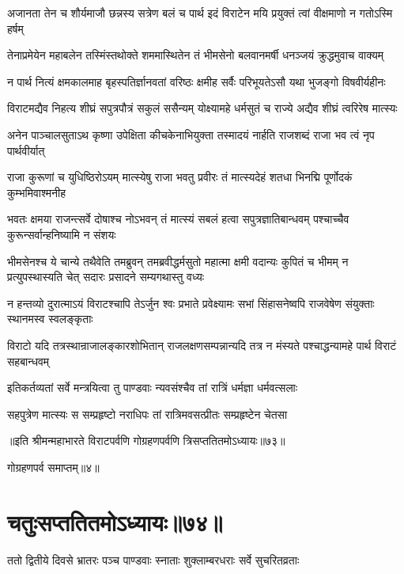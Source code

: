 \fourlineindentedshloka
{अजानता तेन च शौर्यमाजौ}
{छन्नस्य सत्रेण बलं च पार्थ}
{इदं विराटेन मयि प्रयुक्तं}
{त्वां वीक्षमाणो न गतोऽस्मि हर्षम्}


\fourlineindentedshloka
{तेनाप्रमेयेन महाबलेन}
{तस्मिंस्तथोक्ते शममास्थितेन}
{तं भीमसेनो बलवानमर्षी}
{धनञ्जयं क्रुद्धमुवाच वाक्यम्}


\fourlineindentedshloka
{न पार्थ नित्यं क्षमकालमाह}
{बृहस्पतिर्ज्ञानवतां वरिष्ठः}
{क्षमीह सर्वैः परिभूयतेऽसौ}
{यथा भुजङ्गो विषवीर्यहीनः}


\fourlineindentedshloka
{विराटमद्यैव निहत्य शीघ्रं}
{सपुत्रपौत्रं सकुलं ससैन्यम्}
{योक्ष्यामहे धर्मसुतं च राज्ये}
{अद्यैव शीघ्रं त्वरिरेष मात्स्यः}


\fourlineindentedshloka
{अनेन पाञ्चालसुताऽथ कृष्णा}
{उपेक्षिता कीचकेनाभियुक्ता}
{तस्मादयं नार्हति राजशब्दं}
{राजा भव त्वं नृप पार्थवीर्यात्}


\fourlineindentedshloka
{राजा कुरूणां च युधिष्ठिरोऽयम्}
{मात्स्येषु राजा भवतु प्रवीरः}
{तं मात्स्यदेहं शतधा भिनद्मि}
{पूर्णोदकं कुम्भमिवाश्मनीह}




\threelineshloka
{भवतः क्षमया राजन्त्सर्वे दोषाश्च नोऽभवन्}
{तं मात्स्यं सबलं हत्वा सपुत्रज्ञातिबान्धवम्}
{पश्चाच्चैव कुरून्सर्वान्हनिष्यामि न संशयः}


\onelineshloka
{भीमसेनश्च ये चान्ये तथैवेति तमब्रुवन्}
\fourlineindentedshloka
{तमब्रवीद्धर्मसुतो महात्मा}
{क्षमी वदान्यः कुपितं च भीमम्}
{न प्रत्युपस्थास्यति चेत् सदारः}
{प्रसादने सम्यगथास्तु वध्यः}


\onelineshloka
{न हन्तव्यो दुरात्माऽयं विराटश्चापि तेऽर्जुन}
\twolineshloka
{श्वः प्रभाते प्रवेक्ष्यामः सभां सिंहासनेष्वपि}
{राजवेषेण संयुक्ताः स्थानमस्व स्वलङ्कृताः}


\threelineshloka
{विराटो यदि तत्रस्थान्राजालङ्कारशोभितान्}
{राजलक्षणसम्पन्नान्यदि तत्र न मंस्यते}
{पश्चाद्धन्यामहे पार्थ विराटं सहबान्धवम्}


\twolineshloka
{इतिकर्तव्यतां सर्वे मन्त्रयित्वा तु पाण्डवाः}
{न्यवसंश्चैव तां रात्रिं धर्मज्ञा धर्मवत्सलाः}


\twolineshloka
{सहपुत्रेण मात्स्यः स सम्प्रहृष्टो नराधिपः}
{तां रात्रिमवसत्प्रीतः सम्प्रहृष्टेन चेतसा}

॥इति श्रीमन्महाभारते विराटपर्वणि गोग्रहणपर्वणि त्रिसप्ततितमोऽध्यायः॥७३॥ 

गोग्रहणपर्व समाप्तम्॥४॥

\chapter{चतुःसप्ततितमोऽध्यायः॥७४॥}
\twolineshloka
{ततो द्वितीये दिवसे भ्रातरः पञ्च पाण्डवाः}
{स्नाताः शुक्लाम्बरधराः सर्वे सुचरितव्रताः}



